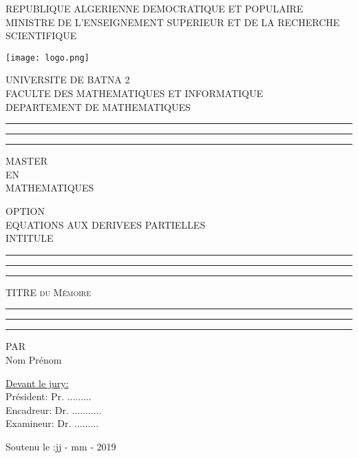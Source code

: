 \documentclass[12pt,a4paper]{book}
\begin{document}
\begin{center}
REPUBLIQUE ALGERIENNE DEMOCRATIQUE ET POPULAIRE\\
MINISTRE DE L'ENSEIGNEMENT SUPERIEUR ET DE LA RECHERCHE SCIENTIFIQUE
\end{center}
\begin{center}
\texttt{[image: logo.png]}  
\end{center}
\begin{center}
UNIVERSITE DE BATNA 2 \\
FACULTE DES MATHEMATIQUES ET INFORMATIQUE\\
DEPARTEMENT DE MATHEMATIQUES\\
\end{center}
\vspace*{0.2cm}
\begin{center}
\hrule \hrule \hrule
\vspace*{0.2cm}
MASTER\\
EN\\
MATHEMATIQUES
\end{center}

\vspace*{0.3 cm}
\begin{center}
OPTION\\
EQUATIONS AUX DERIVEES PARTIELLES \\
\vspace*{0.4cm}
{INTITULE}

\vspace{0.4cm}
\hrule \hrule \hrule
\vspace*{0.5cm}
\begin{center}
\huge\textsc{TITRE du M\'{e}moire}  
\end{center}
\vspace*{0.5cm}
\hrule \hrule \hrule
\vspace*{0.5cm}
PAR\\
 Nom Pr\'{e}nom \\
\end{center}
\vspace{0.4 cm}
\underline{Devant le jury:}
\vspace{0.3 cm}\\
Pr\'{e}sident:  Pr. \; .........  \\
Encadreur: Dr.\; ........... \\
Examineur: Dr.\; .........\\
\vspace{0.5cm}
\begin{center}
Soutenu le :jj - mm - 2019
\end{center}
\end{document}
